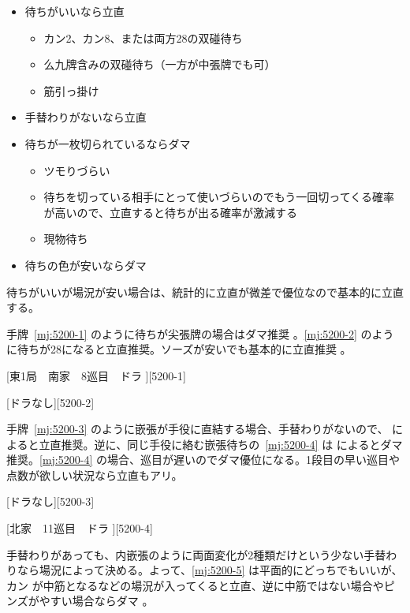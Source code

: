 \documentclass[../nankiru_main.tex]{subfiles}
\begin{document}
\begin{itemize}
  \item 待ちがいいなら立直
  \begin{itemize}
    \item カン2、カン8、または両方28の双碰待ち
    \item 么九牌含みの双碰待ち（一方が中張牌でも可）
    \item 筋引っ掛け
  \end{itemize}
  \item 手替わりがないなら立直
  \item 待ちが一枚切られているならダマ
  \begin{itemize}
    \item ツモりづらい
    \item 待ちを切っている相手にとって使いづらいのでもう一回切ってくる確率が高いので、立直すると待ちが出る確率が激減する
    \item 現物待ち
  \end{itemize}
  \item 待ちの色が安いならダマ
\end{itemize}

待ちがいいが場況が安い場合は、統計的に立直が微差で優位なので基本的に立直する。

手牌~\ref{mj:5200-1} のように待ちが尖張牌の場合はダマ推奨 \citep[][p.~28]{miinin-stat}。\ref{mj:5200-2} のように待ちが28になると立直推奨。ソーズが安いでも基本的に立直推奨 \citep{yoteru-5200riichi}。

[東1局　南家　8巡目　ドラ ][5200-1]

[ドラなし][5200-2]

手牌~\ref{mj:5200-3} のように嵌張が手役に直結する場合、手替わりがないので、\citet{yoteru-5200riichi} によると立直推奨。逆に、同じ手役に絡む嵌張待ちの~\ref{mj:5200-4} は \citet[pp.~149--150]{ooi-gundou} によるとダマ推奨。\ref{mj:5200-4} の場合、巡目が遅いのでダマ優位になる。1段目の早い巡目や点数が欲しい状況なら立直もアリ。

[ドラなし][5200-3]

[北家　11巡目　ドラ ][5200-4]

手替わりがあっても、内嵌張のように両面変化が2種類だけという少ない手替わりなら場況によって決める。よって、\ref{mj:5200-5} は平面的にどっちでもいいが、カン  が中筋となるなどの場況が入ってくると立直、逆に中筋ではない場合やピンズがやすい場合ならダマ \citep{yoteru-5200riichi}。
\end{document}

